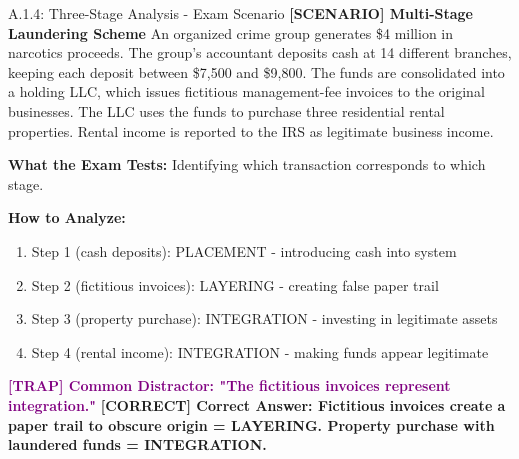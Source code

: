 \documentclass[11pt,a4paper]{beamer}
\newcommand{\trap}[1]{\textcolor{purple}{\textbf{[TRAP] #1}}}
\newcommand{\correct}[1]{\textcolor{green!50!black}{\textbf{[CORRECT] #1}}}
\newcommand{\scenario}[1]{\textcolor{blue!70!black}{\textbf{[SCENARIO] #1}}}
\begin{document}
	\begin{frame}{A.1.4: Three-Stage Analysis - Exam Scenario}
		\scenario{Multi-Stage Laundering Scheme}
		An organized crime group generates \$4 million in narcotics proceeds. The group's accountant deposits cash at 14 different branches, keeping each deposit between \$7,500 and \$9,800. The funds are consolidated into a holding LLC, which issues fictitious management-fee invoices to the original businesses. The LLC uses the funds to purchase three residential rental properties. Rental income is reported to the IRS as legitimate business income.
		
		\vspace{0.1cm}
		\textbf{What the Exam Tests:} Identifying which transaction corresponds to which stage.
		
		\vspace{0.1cm}
		\textbf{How to Analyze:}
		\begin{enumerate}
			\item Step 1 (cash deposits): PLACEMENT - introducing cash into system
			\item Step 2 (fictitious invoices): LAYERING - creating false paper trail
			\item Step 3 (property purchase): INTEGRATION - investing in legitimate assets
			\item Step 4 (rental income): INTEGRATION - making funds appear legitimate
		\end{enumerate}
		
		\trap{Common Distractor: "The fictitious invoices represent integration."}
		\correct{Correct Answer: Fictitious invoices create a paper trail to obscure origin = LAYERING. Property purchase with laundered funds = INTEGRATION.}
	\end{frame}
	
	
\end{document}
